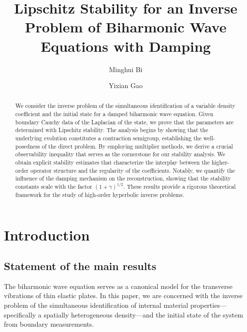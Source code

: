 \documentclass[12pt,reqno]{amsart}
\title[Inverse Problem of Biharmonic wave  Equations]{ Lipschitz Stability for an Inverse Problem of Biharmonic Wave Equations with Damping
}
\author{  Minghui Bi  }
\author{Yixian Gao}
\numberwithin{equation}{section}
\begin{document}
	
	\begin{abstract}
		We consider the inverse problem of the simultaneous identification of a variable density coefficient and the initial state for a damped biharmonic wave equation. Given boundary Cauchy data of the Laplacian of the state, we prove that the parameters are determined with Lipschitz stability. The analysis begins by showing that the underlying evolution constitutes a contraction semigroup, establishing the well-posedness of the direct problem. By employing multiplier methods, we derive a crucial observability inequality that serves as the cornerstone for our stability analysis. We obtain explicit stability estimates that characterize the interplay between the higher-order operator structure and the regularity of the coefficients. Notably, we quantify the influence of the damping mechanism on the reconstruction, showing that the stability constants scale with the factor $(1+\gamma)^{1/2}$. These results provide a rigorous theoretical framework for the study of high-order hyperbolic inverse problems.
		
		
		
		
		
	\end{abstract}
	
	\maketitle
	
	\section{Introduction\label{sect1}}
	
	\subsection{Statement of the main results}
	
	The biharmonic wave equation serves as a canonical model for the transverse vibrations of thin elastic plates. In this paper, we are concerned with the inverse problem of the simultaneous identification of internal material properties—specifically a spatially heterogeneous density—and the initial state of the system from boundary measurements.
	
\end{document}
